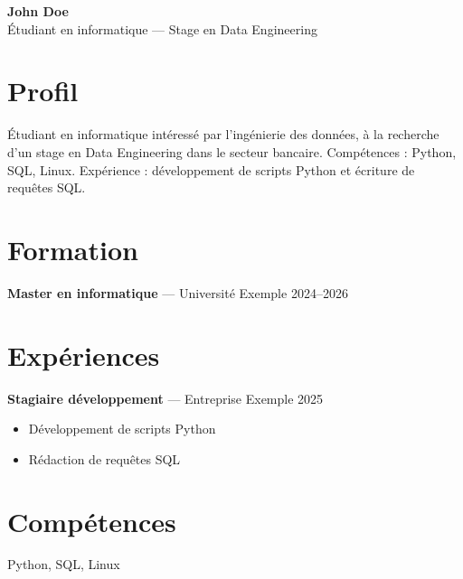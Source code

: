 \documentclass[11pt,a4paper]{article}
\begin{document}
\begin{center}
{\LARGE\bfseries John Doe }\\[3pt]
Étudiant en informatique — Stage en Data Engineering
\end{center}

\section*{Profil}
Étudiant en informatique intéressé par l’ingénierie des données, à la recherche d’un stage en Data Engineering dans le secteur bancaire. Compétences : Python, SQL, Linux. Expérience : développement de scripts Python et écriture de requêtes SQL.

\section*{Formation}

\textbf{Master en informatique} --- Université Exemple \hfill 2024–2026\par


\section*{Expériences}

\textbf{Stagiaire développement} --- Entreprise Exemple \hfill 2025\par
\begin{itemize}

\item Développement de scripts Python

\item Rédaction de requêtes SQL

\end{itemize}


\section*{Compétences}
Python, SQL, Linux
\end{document}
